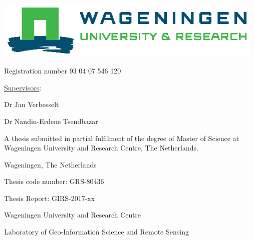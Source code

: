 \documentclass[a4paper,12pt]{scrbook}
\begin{document}
\begin{titlingpage}
  {\Large \theauthor} \vspace{5.9cm}
  
   \vspace{0.5cm}
  
  \includegraphics[width=13cm]{wur-template/WUR_RGB_standard}
  
  \noindent{}
  
  \newpage %
  \thispagestyle{empty}
  
  \begin{center}
  {\bfseries \Large \thetitle} \vspace{2.7cm}
  
  {\Large \theauthor} \vspace{1.1cm}
  
  {Registration number 93 04 07 546 120} \vspace{3.5cm}
  
  {\large \underline{Supervisors}:} \vspace{1.1cm}
  
  {Dr Jan Verbesselt}
  
  {Dr Nandin-Erdene Tsendbazar} \vspace{3.0cm}
  
  {A thesis submitted in partial fulfilment of the degree of Master of Science at Wageningen University and Research Centre, The Netherlands.} \vspace{3.7cm}
  \end{center}
  
  \begin{flushright}
    {\thedate}
  
    {Wageningen, The Netherlands}
  \end{flushright} \vspace{0.5cm}

    Thesis code number: GRS-80436
  
    Thesis Report: GIRS-2017-xx
  
    {Wageningen University and Research Centre}
  
    {Laboratory of Geo-Information Science and Remote Sensing}
\end{titlingpage}
\end{document}
